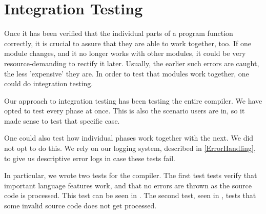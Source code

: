 \section{Integration Testing}
Once it has been verified that the individual parts of a program function correctly, it is crucial to assure that they are able to work together, too.
If one module changes, and it no longer works with other modules, it could be very resource-demanding to rectify it later.
Usually, the earlier such errors are caught, the less 'expensive' they are.
In order to test that modules work together, one could do integration testing.

Our approach to integration testing has been testing the entire compiler. We have opted to test every phase at once. This is also the scenario users are in, so it made sense to test that specific case.

One could also test how individual phases work together with the next. We did not opt to do this. We rely on our logging system, described in \ref{ErrorHandling}, to give us descriptive error logs in case these tests fail.

In particular, we wrote two tests for the \dazel{} compiler. The first test tests verify that important language features work, and that no errors are thrown as the source code is processed. This test can be seen in . The second test, seen in , tests that some invalid source code does not get processed.

